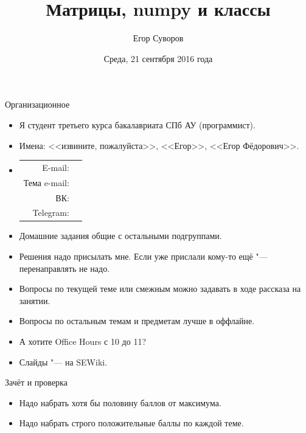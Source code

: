 \documentclass[utf8,xcolor=table]{beamer}
\title{Матрицы, numpy и классы}
\author{Егор Суворов}
\institute[СПб АУ]{Курс <<Парадигмы и языки программирования>>, подгруппа 3}
\date[21.09.2016]{Среда, 21 сентября 2016 года}
\renewcommand{\t}[1]{\ifmmode{\mathtt{#1}}\else{\texttt{#1}}\fi}
\begin{document}
\begin{frame}
\titlepage
\end{frame}

\begin{frame}[t]{Организационное}
	\begin{itemize}
	\item Я студент третьего курса бакалавриата СПб АУ (программист).
	\item Имена: <<извините, пожалуйста>>, <<Егор>>, <<Егор Фёдорович>>.
	\item
		\begin{tabular}{rl}
			E-mail: & \href{mailto:\EgorEmail?subject=[parad]}{\t{\EgorEmail}} \\
			Тема e-mail: & \t{[parad]...} \\
			ВК: & \href{https://vk.com/\EgorVk}{\t{\EgorVk}} \\
			Telegram: & \href{https://telegram.me/\EgorTelegram}{\t{\EgorTelegram}}
		\end{tabular}
	\item
		Домашние задания общие с остальными подгруппами.
	\item
		Решения надо присылать мне.
		Если уже прислали кому-то ещё "--- перенаправлять не надо.
	\item
		Вопросы по текущей теме или смежным можно задавать в ходе рассказа на занятии.
	\item
		Вопросы по остальным темам и предметам лучше в оффлайне.
	\item
		А хотите Office Hours с 10 до 11?
	\item
		Слайды "--- на SEWiki.
	\end{itemize}
\end{frame}

\begin{frame}[t]{Зачёт и проверка}
	\begin{itemize}
		\item Надо набрать хотя бы половину баллов от максимума.
		\item Надо набрать строго положительные баллы по каждой теме.
	\end{itemize}
\end{frame}
\end{document}

